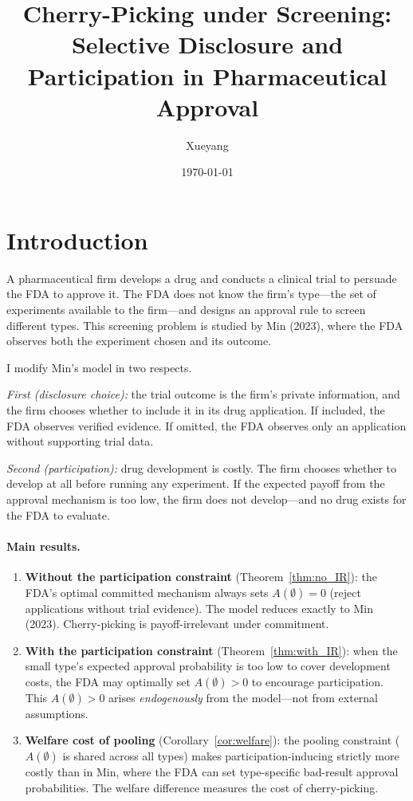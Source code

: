 \documentclass[12pt,a4paper]{article}
\title{Cherry-Picking under Screening:\\
  Selective Disclosure and Participation in
  Pharmaceutical Approval}
\author{Xueyang}
\date{\today}
\begin{document}
\maketitle

\section{Introduction}

A pharmaceutical firm develops a drug and conducts a clinical
trial to persuade the FDA to approve it. The FDA does not know
the firm's type---the set of experiments available to the
firm---and designs an approval rule to screen different types.
This screening problem is studied by Min (2023), where the FDA
observes both the experiment chosen and its outcome.

I modify Min's model in two respects.

\emph{First (disclosure choice):} the trial outcome is the
firm's private information, and the firm chooses whether to
include it in its drug application. If included, the FDA
observes verified evidence. If omitted, the FDA observes only
an application without supporting trial data.

\emph{Second (participation):} drug development is costly.
The firm chooses whether to develop at all before running any
experiment. If the expected payoff from the approval mechanism
is too low, the firm does not develop---and no drug exists for
the FDA to evaluate.

\paragraph{Main results.}
\begin{enumerate}
  \item \textbf{Without the participation constraint}
    (Theorem~\ref{thm:no_IR}): the FDA's optimal committed
    mechanism always sets $A(\emptyset) = 0$ (reject
    applications without trial evidence). The model reduces
    exactly to Min (2023). Cherry-picking is
    payoff-irrelevant under commitment.

  \item \textbf{With the participation constraint}
    (Theorem~\ref{thm:with_IR}): when the small type's
    expected approval probability is too low to cover
    development costs, the FDA may optimally set
    $A(\emptyset) > 0$ to encourage participation. This
    $A(\emptyset) > 0$ arises \emph{endogenously} from the
    model---not from external assumptions.

  \item \textbf{Welfare cost of pooling}
    (Corollary~\ref{cor:welfare}): the pooling constraint
    ($A(\emptyset)$ is shared across all types) makes
    participation-inducing strictly more costly than in Min,
    where the FDA can set type-specific bad-result approval
    probabilities. The welfare difference measures the cost
    of cherry-picking.
\end{enumerate}
\end{document}
